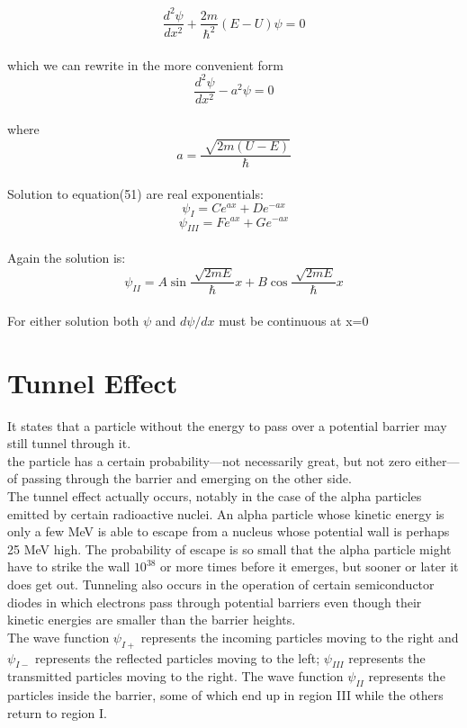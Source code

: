 \documentclass{article}
\begin{document}
\begin{equation}
    \frac{d^2\psi}{dx^2}+\frac{2m}{\hbar^2}(E-U)\psi=0
\end{equation}
\\
which we can rewrite in the more convenient form
\begin{equation}
    \frac{d^2\psi}{dx^2}-a^2\psi=0
\end{equation}
\\
where 
\begin{equation}
    a=\frac{\sqrt[]{2m(U-E)}}{\hbar}
\end{equation}
\\
Solution to equation(51) are real exponentials:
\begin{equation}
    \psi_I=Ce^{ax}+De^{-ax}
\end{equation}
\begin{equation}
    \psi_{III}=Fe^{ax}+Ge^{-ax}
\end{equation}
\\
Again the solution is:
\begin{equation}
    \psi_{II}=A\sin\frac{\sqrt[]{2mE}}{\hbar}x+B\cos\frac{\sqrt[]{2mE}}{\hbar}x
\end{equation}
\\
For either solution both $\psi$ and $d\psi/dx$ must be continuous at x=0

\section*{Tunnel Effect}

It states that a particle without the energy to pass over a potential barrier may still
tunnel through it.
\\
the particle has a certain probability—not necessarily great, but not zero either—of passing through the barrier and emerging
on the other side.\vspace*{5pt}
\\ 
The tunnel effect actually occurs, notably in the case of the alpha particles emitted by certain radioactive nuclei. An alpha particle whose
kinetic energy is only a few MeV is able to escape from a nucleus whose potential wall
is perhaps 25 MeV high. The probability of escape is so small that the alpha particle
might have to strike the wall $10^{38}$ or more times before it emerges, but sooner or later
it does get out. Tunneling also occurs in the operation of certain semiconductor diodes in which electrons pass through potential barriers even though their kinetic
energies are smaller than the barrier heights.\vspace{15pt}
\\
The wave function $\psi_{I+}$ represents the incoming particles moving to the
right and $\psi_{I-}$ represents the reflected particles moving to the left; $\psi_{III}$ represents the transmitted particles moving to the right. The wave function $\psi_{II}$ represents the particles inside the barrier, some of which end up in region III while the others return to
region I. 
\end{document}

